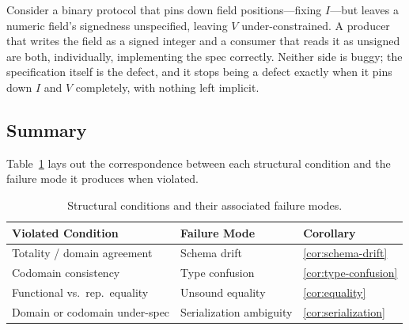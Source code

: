 \begin{example}
Consider a binary protocol that pins down field positions---fixing
$I$---but leaves a numeric field's signedness unspecified, leaving $V$
under-constrained. A producer that writes the field as a signed integer
and a consumer that reads it as unsigned are both, individually,
implementing the spec correctly. Neither side is buggy; the
specification itself is the defect, and it stops being a defect exactly
when it pins down $I$ and $V$ completely, with nothing left implicit.
\end{example}

\subsection{Summary}

Table~\ref{tab:corollaries} lays out the correspondence between each
structural condition and the failure mode it produces when violated.

\begin{table}[htbp]
\centering
\caption{Structural conditions and their associated failure modes.}
\label{tab:corollaries}
\begin{tabular}{lll}
\hline
\textbf{Violated Condition} & \textbf{Failure Mode} & \textbf{Corollary} \\
\hline
Totality / domain agreement   & Schema drift           & \ref{cor:schema-drift} \\
Codomain consistency          & Type confusion         & \ref{cor:type-confusion} \\
Functional vs.\ rep.\ equality & Unsound equality       & \ref{cor:equality} \\
Domain or codomain under-spec & Serialization ambiguity & \ref{cor:serialization} \\
\hline
\end{tabular}
\end{table}